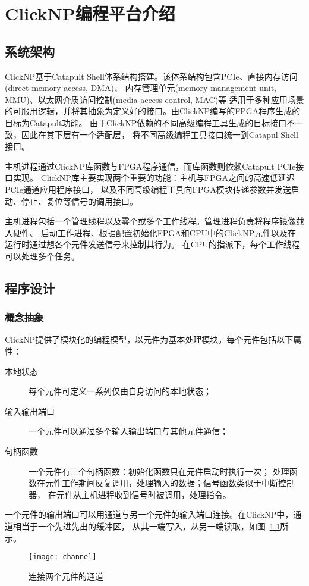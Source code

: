 \chapter{ClickNP编程平台介绍}
\section{系统架构}
ClickNP基于Catapult Shell体系结构搭建。该体系结构包含PCIe、直接内存访问(direct memory access, DMA)、
内存管理单元(memory management unit, MMU)、以太网介质访问控制(media access control, MAC)等
适用于多种应用场景的可服用逻辑，并将其抽象为定义好的接口。由ClickNP编写的FPGA程序生成的目标为Catapult功能。
由于ClickNP依赖的不同高级编程工具生成的目标接口不一致，因此在其下层有一个适配层，
将不同高级编程工具接口统一到Catapul Shell接口。

主机进程通过ClickNP库函数与FPGA程序通信，而库函数则依赖Catapult PCIe接口实现。
ClickNP库主要实现两个重要的功能：主机与FPGA之间的高速低延迟PCIe通道应用程序接口，
以及不同高级编程工具向FPGA模块传递参数并发送启动、停止、复位等信号的调用接口。

主机进程包括一个管理线程以及零个或多个工作线程。管理进程负责将程序镜像载入硬件、
启动工作进程、根据配置初始化FPGA和CPU中的ClickNP元件以及在运行时通过想各个元件发送信号来控制其行为。
在CPU的指派下，每个工作线程可以处理多个任务。

\section{程序设计}
\subsection{概念抽象}
ClickNP提供了模块化的编程模型，以元件为基本处理模块。每个元件包括以下属性：
\begin{description}
\item[本地状态]每个元件可定义一系列仅由自身访问的本地状态；
\item[输入输出端口]一个元件可以通过多个输入输出端口与其他元件通信；
\item[句柄函数]一个元件有三个句柄函数：初始化函数只在元件启动时执行一次；
处理函数在元件工作期间反复调用，处理输入的数据；信号函数类似于中断控制器，
在元件从主机进程收到信号时被调用，处理指令。
\end{description}

一个元件的输出端口可以用通道与另一个元件的输入端口连接。在ClickNP中，通道相当于一个先进先出的缓冲区，
从其一端写入，从另一端读取，如图~\ref{fig:channel}所示。
\begin{figure}[ht]
\centering
\texttt{[image: channel]}
\caption{连接两个元件的通道} \label{fig:channel}
\end{figure}

